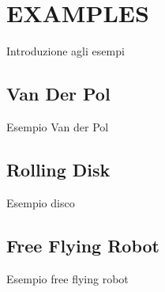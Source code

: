 \section*{EXAMPLES}
Introduzione agli esempi 

\subsection*{Van Der Pol}
Esempio Van der Pol

\subsection*{Rolling Disk}
Esempio disco

\subsection*{Free Flying Robot}
Esempio free flying robot

\cite{latex, goosens} 